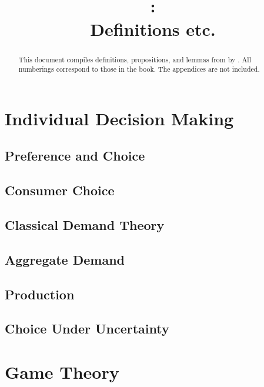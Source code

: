 \documentclass{report} %
\title{\citetitle{mas1995microeconomic}\\\parencite{mas1995microeconomic}:\\Definitions etc.}
\author{}
\date{}
\theoremstyle{definition}
\begin{document}
\maketitle

\begin{abstract}
	This document compiles definitions, propositions, and lemmas from  by \cite{mas1995microeconomic}.
	All numberings correspond to those in the book.
	The appendices are not included.
\end{abstract}

\tableofcontents

\part{Individual Decision Making}

\chapter{Preference and Choice}


\chapter{Consumer Choice}


\chapter{Classical Demand Theory}


\chapter{Aggregate Demand}


\chapter{Production}


\chapter{Choice Under Uncertainty}



\part{Game Theory}
\end{document}
